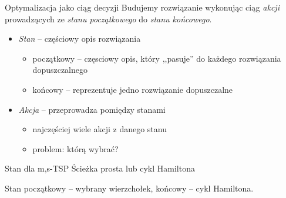 
\begin{frame}{Optymalizacja jako ciąg decyzji}
  Budujemy rozwiązanie wykonując ciąg \emph{akcji} prowadzących ze \emph{stanu
  początkowego} do \emph{stanu końcowego}.
  \pause
  \begin{itemize}
    \item \emph{Stan} -- częściowy opis rozwiązania
      \begin{itemize}
        \item początkowy -- częsciowy opis, który ,,pasuje'' do każdego
          rozwiązania dopuszczalnego
        \item końcowy -- reprezentuje jedno rozwiązanie dopuszczalne
      \end{itemize}
      \pause
    \item \emph{Akcja} -- przeprowadza pomiędzy stanami
      \begin{itemize}
        \item najczęściej wiele akcji z danego stanu
        \item problem: którą wybrać?
      \end{itemize}
  \end{itemize}
\end{frame}

\begin{frame}{Stan dla m,s-TSP}
  Ścieżka prosta lub cykl Hamiltona
  \begin{figure}[H]
    \centering
  \end{figure}
  Stan początkowy -- wybrany wierzchołek, końcowy -- cykl Hamiltona.
\end{frame}


